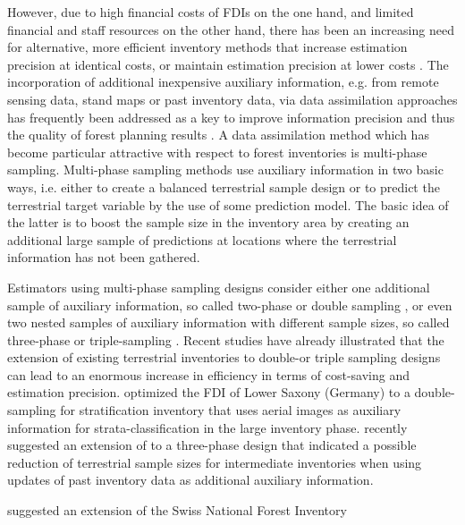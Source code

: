 However, due to high financial costs of FDIs on the one hand, and limited financial and staff resources on the other hand, there has been an increasing need for alternative, more efficient inventory methods that increase estimation precision at identical costs, or maintain estimation precision at lower costs \citep{vonluepke2013}. The incorporation of additional inexpensive auxiliary information, e.g. from remote sensing data, stand maps or past inventory data, via data assimilation approaches has frequently been addressed as a key to improve information precision and thus the quality of forest planning results \citep{saad2017}. A data assimilation method which has become particular attractive with respect to forest inventories is multi-phase sampling. Multi-phase sampling methods use auxiliary information in two basic ways, i.e. either to create a balanced terrestrial sample design \citep{grafstrom2017a} or to predict the terrestrial target variable by the use of some prediction model. The basic idea of the latter is to boost the sample size in the inventory area by creating an additional large sample of predictions at locations where the terrestrial information has not been gathered.\par

Estimators using multi-phase sampling designs consider either one additional sample of auxiliary information, so called two-phase or double sampling \citep{gregoire2007, mandallaz2008}, or even two nested samples of auxiliary information with different sample sizes, so called three-phase or triple-sampling \citep{mandallaz2013c}. Recent studies have already illustrated that the extension of existing terrestrial inventories to double-or triple sampling designs can lead to an enormous increase in efficiency in terms of cost-saving and estimation precision. \citet{bockmann1998, saborowski2010} optimized the FDI of Lower Saxony (Germany) to a double-sampling for stratification inventory that uses aerial images as auxiliary information for strata-classification in the large inventory phase. \citet{vonLuepke2012} recently suggested an extension of to a three-phase design that indicated a possible reduction of terrestrial sample sizes for intermediate inventories when using updates of past inventory data as additional auxiliary information. \citet{massey2014a} 



suggested an extension of the Swiss National Forest Inventory 




%
%

